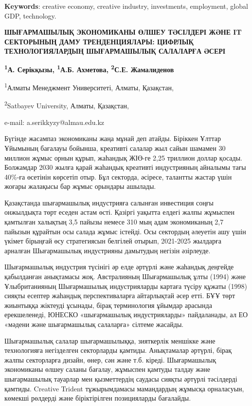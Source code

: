 {\bfseries Keywords}: creative economy, creative industry, investments,
employment, global GDP, technology.

\begin{center}
{\large\bfseries ШЫҒАРМАШЫЛЫҚ ЭКОНОМИКАНЫ ӨЛШЕУ ТӘСІЛДЕРІ ЖӘНЕ IT СЕКТОРЫНЫҢ ДАМУ
ТРЕНДЕНЦИЯЛАРЫ: ЦИФРЛЫҚ ТЕХНОЛОГИЯЛАРДЫҢ ШЫҒАРМАШЫЛЫҚ САЛАЛАРҒА ӘСЕРІ}

{\bfseries \textsuperscript{1}А. Серікқызы, \textsuperscript{1}А.Б.
Ахметова, \textsuperscript{2}С.Е. Жамалиденов}

\textsuperscript{1}Алматы Менеджмент Университеті, Алматы, Қазақстан,

\textsuperscript{2}Satbayev University, Алматы, Қазақстан,

e-mail: a.serikkyzy@almau.edu.kz
\end{center}

Бүгінде жасампаз экономиканы жаңа мұнай деп атайды. Біріккен Ұлттар
Ұйымының бағалауы бойынша, креативті салалар жыл сайын шамамен 30
миллион жұмыс орнын құрып, жаһандық ЖІӨ-ге 2,25 триллион доллар қосады.
Болжамдар 2030 жылға қарай жаһандық креативті индустрияның айналымы тағы
40\%-ға өсетінін көрсетіп отыр. Бұл секторда, әсіресе, талантты жастар
үшін жоғары жалақысы бар жұмыс орындары ашылады.

Қазақстанда шығармашылық индустрияға салынған инвестиция соңғы
онжылдықта төрт еседен астам өсті. Қазіргі уақытта елдегі жалпы жұмыспен
қамтылған халықтың 3,5 пайызы немесе 310 мың адам экономиканың 2,7
пайызын құрайтын осы салада жұмыс істейді. Осы сектордың әлеуетін ашу
үшін үкімет бірыңғай өсу стратегиясын белгілей отырып, 2021-2025
жылдарға арналған Шығармашылық индустрияны дамытудың негізін әзірлеуде.

Шығармашылық индустрия түсінігі әр елде әртүрлі және жаһандық деңгейде
қабылданған анықтамасы жоқ. Австралияның Шығармашылық ұлты (1994) және
Ұлыбританияның Шығармашылық индустрияларды картаға түсіру құжаты (1998)
сияқты есептер жаһандық перспективаларға айтарлықтай әсер етті. БҰҰ төрт
жиынтыққа жіктеуді ұсынады, бірақ терминология ұйымдар арасында
ерекшеленеді, ЮНЕСКО «шығармашылық индустрияларды» пайдаланады, ал ЕО
«мәдени және шығармашылық салаларға» сілтеме жасайды.

Шығармашылық салалар шығармашылыққа, зияткерлік меншікке және
технологияға негізделген секторларды қамтиды. Анықтамалар әртүрлі, бірақ
жалпы секторларға дизайн, өнер, сән және т.б. кіреді. Шығармашылық
экономиканы өлшеу саланы бағалау, жұмыспен қамтуды талдау және
шығармашылық тауарлар мен қызметтердің саудасы сияқты әртүрлі тәсілдерді
қамтиды. Creative Trident тұжырымдамасы мамандардың жұмысқа орналасуын,
көмекші рөлдерді және біріктірілген позицияларды бағалайды.

